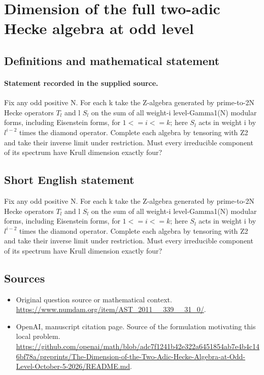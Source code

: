 \documentclass[11pt]{article}
\begin{document}
\section*{Dimension of the full two-adic Hecke algebra at odd level}\label{statement}
\subsection{Definitions and mathematical statement}
\paragraph{Statement recorded in the supplied source.}
Fix any odd positive N. For each k take the Z-algebra generated by prime-to-2N Hecke operators $T_l$ and l $S_l$ on the sum of all weight-i level-Gamma1(N) modular forms, including Eisenstein forms, for $1<=i<=k$; here $S_l$ acts in weight i by $l^{i-2}$ times the diamond operator. Complete each algebra by tensoring with Z2 and take their inverse limit under restriction. Must every irreducible component of its spectrum have Krull dimension exactly four?
\subsection{Short English statement}
Fix any odd positive N. For each k take the Z-algebra generated by prime-to-2N Hecke operators $T_l$ and l $S_l$ on the sum of all weight-i level-Gamma1(N) modular forms, including Eisenstein forms, for $1<=i<=k$; here $S_l$ acts in weight i by $l^{i-2}$ times the diamond operator. Complete each algebra by tensoring with Z2 and take their inverse limit under restriction. Must every irreducible component of its spectrum have Krull dimension exactly four?
\subsection{Sources}
\begin{itemize}
\item[S1] Original question source or mathematical context.
\url{https://www.numdam.org/item/AST_2011__339__31_0/}.
\item[S2] OpenAI, manuscript citation page. Source of the formulation motivating this local problem.
\url{https://github.com/openai/math/blob/adc7f1241b42e322a6451854ab7e4b4c146bf78a/preprints/The-Dimension-of-the-Two-Adic-Hecke-Algebra-at-Odd-Level-October-5-2026/README.md}.
\end{itemize}
\end{document}
